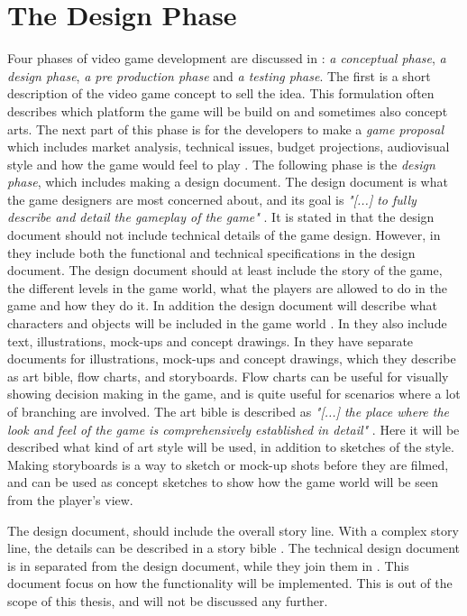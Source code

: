 \section{The Design Phase}
\label{sec:designphase}
Four phases of video game development are discussed in \cite{understandingvg}: \emph{a conceptual phase}, \emph{a design phase}, \emph{a pre production phase} and \emph{a testing phase}. The first is a short description of the video game concept to sell the idea. This formulation often describes which platform the game will be build on and sometimes also concept arts. The next part of this phase is for the developers to make a \emph{game proposal} which includes market analysis, technical issues, budget projections, audiovisual style and how the game would feel to play \cite{understandingvg}. The following phase is the \emph{design phase}, which includes making a design document. The design document is what the game designers are most concerned about, and its goal is \emph{"[...] to fully describe and detail the gameplay of the game"} \cite{gamedesign}. It is stated in \cite{gamedesign} that the design document should not include technical details of the game design. However, in \cite{understandingvg} they include both the functional and technical specifications in the design document. The design document should at least include the story of the game, the different levels in the game world, what the players are allowed to do in the game and how they do it. In addition the design document will describe what characters and objects will be included in the game world \cite{gamedesign}. In \cite{understandingvg} they also include text, illustrations, mock-ups and concept drawings.  In \cite{gamedesign} they have separate documents for illustrations, mock-ups and concept drawings, which they describe as art bible, flow charts, and storyboards. Flow charts can be useful for visually showing decision making in the game, and is quite useful for scenarios where a lot of branching are involved. The art bible is described as \emph{"[...] the place where the look and feel of the game is comprehensively established in detail"} \cite{gamedesign}. Here it will be described what kind of art style will be used, in addition to sketches of the style. Making storyboards is a way to sketch or mock-up shots before they are filmed, and can be used as concept sketches to show how the game world will be seen from the player's view. 

The design document, should include the overall story line. With a complex story line, the details can be described in a story bible \cite{gamedesign}.  The technical design document is in \cite{gamedesign} separated from the design document, while they join them in \cite{understandingvg}. This document focus on how the functionality will be implemented. This is out of the scope of this thesis, and will not be discussed any further. 

